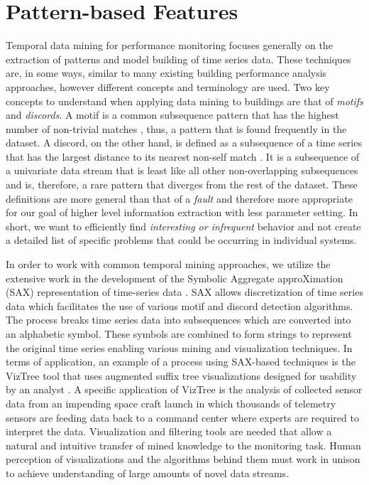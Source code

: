 \section{Pattern-based Features}
\label{sec:weatherfeatures}

Temporal data mining for performance monitoring focuses generally on the extraction of patterns and model building of time series data. These techniques are, in some ways, similar to many existing building performance analysis approaches, however different concepts and terminology are used. Two key concepts to understand when applying data mining to buildings are that of \emph{motifs} and \emph{discords}. A motif is a common subsequence pattern that has the highest number of non-trivial matches \cite{Patel:2002bb}, thus, a pattern that is found frequently in the dataset. A discord, on the other hand, is defined as a subsequence of a time series that has the largest distance to its nearest non-self match \cite{Keogh:2005wd}. It is a subsequence of a univariate data stream that is least like all other non-overlapping subsequences and is, therefore, a rare pattern that diverges from the rest of the dataset. These definitions are more general than that of a \emph{fault} and therefore more appropriate for our goal of higher level information extraction with less parameter setting. In short, we want to efficiently find \emph{interesting or infrequent} behavior and not create a detailed list of specific problems that could be occurring in individual systems.

In order to work with common temporal mining approaches, we utilize the extensive work in the development of the Symbolic Aggregate approXimation (SAX) representation of time-series data \cite{Lin:2003wz}. SAX allows discretization of time series data which facilitates the use of various motif and discord detection algorithms. The process breaks time series data into subsequences which are converted into an alphabetic symbol. These symbols are combined to form strings to represent the original time series enabling various mining and visualization techniques. In terms of application, an example of a process using SAX-based techniques is the VizTree tool that uses augmented suffix tree visualizations designed for usability by an analyst \cite{Lin:2004wv,Lin:2005bi}. A specific application of VizTree is the analysis of collected sensor data from an impending space craft launch in which thousands of telemetry sensors are feeding data back to a command center where experts are required to interpret the data. Visualization and filtering tools are needed that allow a natural and intuitive transfer of mined knowledge to the monitoring task. Human perception of visualizations and the algorithms behind them must work in unison to achieve understanding of large amounts of novel data streams. 

